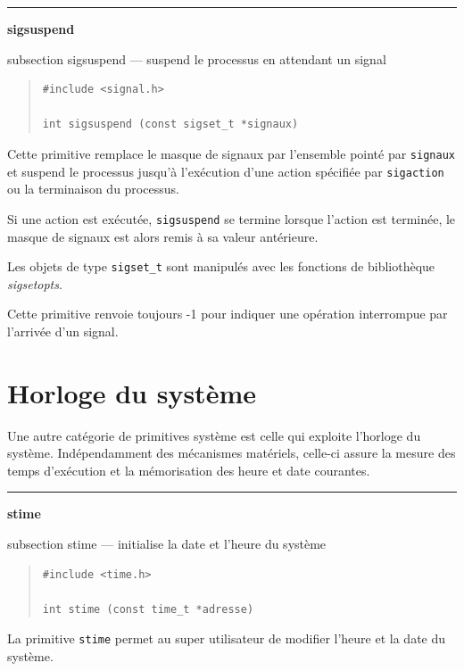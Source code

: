 \documentclass [twoside] {report}
\newcommand {\primitive} [1]
    {
	\phantomsection
	{\large \textbf {#1}}
	\addcontentsline {toc} {subsection} {#1}
    }
\newcommand {\separation}
    {
	\vspace {5mm}
	\nopagebreak
	\hrule
    }
\begin{document}
\separation
\primitive {sigsuspend} --- suspend le processus en attendant un signal

\begin {quote}
\begin {verbatim}
#include <signal.h>

int sigsuspend (const sigset_t *signaux)
\end{verbatim}
\end {quote}

Cette primitive remplace le masque de signaux par l'ensemble pointé par
\texttt {signaux} et suspend le processus jusqu'à l'exécution d'une action
spécifiée par \texttt {sigaction} ou la terminaison du processus.

Si une action est exécutée, \texttt {sigsuspend} se termine lorsque l'action
est terminée, le masque de signaux est alors remis à sa valeur
antérieure.

Les objets de type \texttt {sigset\_t} sont manipulés avec les fonctions de
bibliothèque \emph {sigsetopts}.

Cette primitive renvoie toujours -1 pour indiquer une opération
interrompue par l'arrivée d'un signal.



\section {Horloge du système}


Une autre catégorie de primitives système est
celle qui exploite l'horloge du système.
Indépendamment des mécanismes matériels, celle-ci
assure la mesure des temps d'exé\-cu\-tion et la
mémorisation des heure et date courantes.



\separation
\primitive {stime} --- initialise la date et l'heure du système

\begin {quote}
\begin {verbatim}
#include <time.h>

int stime (const time_t *adresse)
\end{verbatim}
\end {quote}

La primitive \texttt {stime} permet au super
utilisateur de modifier l'heure et la date du
système.
\end{document}
